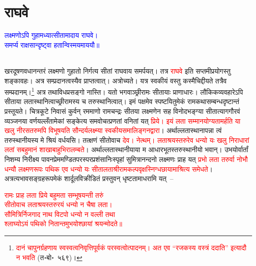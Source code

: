 \section[राघवे]{राघवे}
\label{sec:raaghave_3_5_36}
\centering\textcolor{blue}{लक्ष्मणोऽपि गुहामध्यात्सीतामादाय राघवे।\nopagebreak\\
समर्प्य राक्षसान्दृष्ट्वा हतान्विस्मयमाययौ॥}\nopagebreak\\
\\
\begin{sloppypar}\justifying\noindent\hspace{10mm} खर\-दूषण\-वधानन्तरं लक्ष्मणो गुहातो निर्गत्य सीतां राघवाय समर्पयत्। तत्र \textcolor{red}{राघवे} इति सप्तमी\-प्रयोगस्तु शङ्कावहः। अत्र सम्प्रदानत्वस्यैव प्राप्तत्वात्। अत्रोच्यते। यत्र स्वकीयं वस्तु कस्मैचिद्दीयते तत्रैव सम्प्रदानम्।\footnote{\textcolor{red}{दानं चापुनर्ग्रहणाय स्व\-स्वत्व\-निवृत्तिपूर्वकं पर\-स्वत्वोत्पादनम्‌। अत एव “रजकस्य वस्त्रं ददाति” इत्यादौ न भवति} (त॰बो॰~५६९)।} अत्र तथाविध\-प्रसङ्गो नास्ति। यतो भगवाञ्छ्रीरामः सीतायाः प्राणाधारः। लौकिक\-व्यवहारेऽपि सीताया लता\-स्थानित्वाच्छ्रीरामस्य च तरु\-स्थानित्वात्। इमं पक्षमेव स्पष्टयितुमेकं राम\-कथा\-सम्बन्ध\-दृष्टान्तं प्रस्तूयते। चित्रकूटे निवासं कुर्वन् रममाणो रामचन्द्रः सीतया लक्ष्मणेन सह विनोद\-भङ्ग्या सीता\-त्याग\-गौरवं व्यञ्जनया वर्णयल्लँतामेकां सङ्केत्य समवोचत्प्रणतां वनितां यत् \textcolor{red}{प्रिये। इयं लता सम्मान\-योग्यतामर्हति या खलु नीरस\-तरुमपि विभूषयति सौन्दर्य\-लक्ष्म्या स्वकीय\-समालिङ्गन\-द्वारा}। अर्थाल्लतास्थानापन्ना त्वं तरु\-स्थानीयस्य मे श्रियं वर्धयसि। तत्क्षणं सीतोवाच \textcolor{red}{देव। नेत्थम्। लताश्रयस्तरुरेव धन्यो यः खलु निराधारां लतां सबहुमानं शाखा\-बाहुभिरालम्बते}। अर्थाल्लतास्थानीयाया म आधार\-भूतस्तरु\-स्थानीयो भवान्। उभयोर्वार्तां निशम्य निरीक्ष्य पावन\-प्रेम\-मण्डित\-परस्पर\-प्रशंसा\-निःस्पृहां सुमित्रा\-नन्दनो लक्ष्मणः प्राह यत् \textcolor{red}{प्रभो लता तरुर्वा नोभौ धन्यौ लक्ष्मण\-रूपः पथिक एव धन्यो यः सीता\-लता\-श्रीराम\-कल्प\-वृक्ष\-स्निग्ध\-छायामाश्रित्य समेधते}। अत्रत्य\-भाव\-सङ्ग्रह\-रूपमेकं शार्दूल\-विक्रीडितं प्रस्तुवन् धृष्टतामाधरामि यत्~–\end{sloppypar}
\centering\textcolor{red}{रामः प्राह लता प्रिये बहुमता सम्भूषयन्ती तरुं\nopagebreak\\
सीतोवाच लताश्रयस्तरुरयं धन्यो न चैषा लता।\nopagebreak\\
सौमित्रिर्निजगाद नाथ विटपो धन्यो न वल्ली तथा\nopagebreak\\
श्लाघ्योऽयं पथिको नितान्तमुभयोश्छायां श्रयन्मोदते॥}\\
